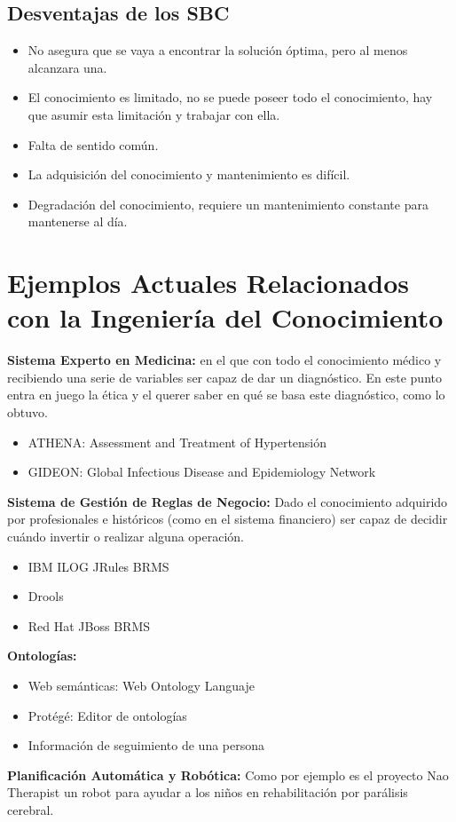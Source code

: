 \documentclass[12pt, twoside, openright]{report} %
\begin{document}
\subsection{Desventajas de los SBC}
\begin{itemize}
  \item No asegura que se vaya a encontrar la solución óptima, pero al menos alcanzara una.
  \item El conocimiento es limitado, no se puede poseer todo el conocimiento, hay que asumir esta limitación y trabajar con ella.
  \item Falta de sentido común.
  \item La adquisición del conocimiento y mantenimiento es difícil.
  \item Degradación del conocimiento, requiere un mantenimiento constante para mantenerse al día.
\end{itemize}

\section{Ejemplos Actuales Relacionados con la Ingeniería del Conocimiento}
\textbf{Sistema Experto en Medicina:} en el que con todo el conocimiento médico y recibiendo una serie de variables ser capaz de dar un diagnóstico. En este punto entra en juego la ética y el querer saber en qué se basa este diagnóstico, como lo obtuvo.
\begin{itemize}
  \item ATHENA: Assessment and Treatment of Hypertensión
	\item GIDEON: Global Infectious Disease and Epidemiology Network
\end{itemize}

\textbf{Sistema de Gestión de Reglas de Negocio:} Dado el conocimiento adquirido por profesionales e históricos (como en el sistema financiero) ser capaz de decidir cuándo invertir o realizar alguna operación.
\begin{itemize}
  \item IBM ILOG JRules BRMS
	\item Drools
	\item Red Hat JBoss BRMS
\end{itemize}

\textbf{Ontologías:}
\begin{itemize}
  \item Web semánticas: Web Ontology Languaje
	\item Protégé: Editor de ontologías
	\item Información de seguimiento de una persona
\end{itemize}

\textbf{Planificación Automática y Robótica:} Como por ejemplo es el proyecto Nao Therapist un robot para ayudar a los niños en rehabilitación por parálisis cerebral.
\end{document}
